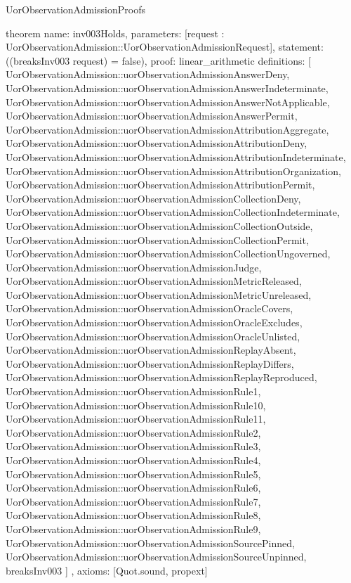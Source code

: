 \begin{lexlean}{UorObservationAdmissionProofs}
\begin{semanticmodule}
theorem{
  name: inv003Holds,
  parameters: [request : UorObservationAdmission::UorObservationAdmissionRequest],
  statement: ((breaksInv003 request) = false),
  proof: linear_arithmetic{
    definitions: [
      UorObservationAdmission::uorObservationAdmissionAnswerDeny,
      UorObservationAdmission::uorObservationAdmissionAnswerIndeterminate,
      UorObservationAdmission::uorObservationAdmissionAnswerNotApplicable,
      UorObservationAdmission::uorObservationAdmissionAnswerPermit,
      UorObservationAdmission::uorObservationAdmissionAttributionAggregate,
      UorObservationAdmission::uorObservationAdmissionAttributionDeny,
      UorObservationAdmission::uorObservationAdmissionAttributionIndeterminate,
      UorObservationAdmission::uorObservationAdmissionAttributionOrganization,
      UorObservationAdmission::uorObservationAdmissionAttributionPermit,
      UorObservationAdmission::uorObservationAdmissionCollectionDeny,
      UorObservationAdmission::uorObservationAdmissionCollectionIndeterminate,
      UorObservationAdmission::uorObservationAdmissionCollectionOutside,
      UorObservationAdmission::uorObservationAdmissionCollectionPermit,
      UorObservationAdmission::uorObservationAdmissionCollectionUngoverned,
      UorObservationAdmission::uorObservationAdmissionJudge,
      UorObservationAdmission::uorObservationAdmissionMetricReleased,
      UorObservationAdmission::uorObservationAdmissionMetricUnreleased,
      UorObservationAdmission::uorObservationAdmissionOracleCovers,
      UorObservationAdmission::uorObservationAdmissionOracleExcludes,
      UorObservationAdmission::uorObservationAdmissionOracleUnlisted,
      UorObservationAdmission::uorObservationAdmissionReplayAbsent,
      UorObservationAdmission::uorObservationAdmissionReplayDiffers,
      UorObservationAdmission::uorObservationAdmissionReplayReproduced,
      UorObservationAdmission::uorObservationAdmissionRule1,
      UorObservationAdmission::uorObservationAdmissionRule10,
      UorObservationAdmission::uorObservationAdmissionRule11,
      UorObservationAdmission::uorObservationAdmissionRule2,
      UorObservationAdmission::uorObservationAdmissionRule3,
      UorObservationAdmission::uorObservationAdmissionRule4,
      UorObservationAdmission::uorObservationAdmissionRule5,
      UorObservationAdmission::uorObservationAdmissionRule6,
      UorObservationAdmission::uorObservationAdmissionRule7,
      UorObservationAdmission::uorObservationAdmissionRule8,
      UorObservationAdmission::uorObservationAdmissionRule9,
      UorObservationAdmission::uorObservationAdmissionSourcePinned,
      UorObservationAdmission::uorObservationAdmissionSourceUnpinned,
      breaksInv003
    ]
  },
  axioms: [Quot.sound, propext]
}


\end{semanticmodule}
\end{lexlean}
